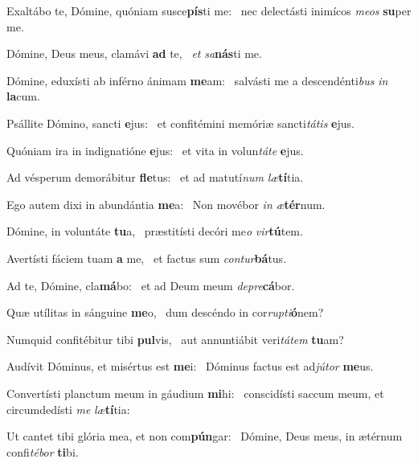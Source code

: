 \item Exaltábo te, Dómine, quóniam susce\textbf{pís}ti me:~\psstar{} nec delectásti inimícos \textit{meos} \textbf{su}per me.
\item Dómine, Deus meus, clamávi \textbf{ad} te,~\psstar{} \textit{et} \textit{sa}\textbf{nás}ti me.
\item Dómine, eduxísti ab inférno ánimam \textbf{me}am:~\psstar{} salvásti me a descendénti\textit{bus} \textit{in} \textbf{la}cum.
\item Psállite Dómino, sancti \textbf{e}jus:~\psstar{} et confitémini memóriæ sancti\textit{tátis} \textbf{e}jus.
\item Quóniam ira in indignatióne \textbf{e}jus:~\psstar{} et vita in volun\textit{táte} \textbf{e}jus.
\item Ad vésperum demorábitur \textbf{fle}tus:~\psstar{} et ad matutí\textit{num} \textit{læ}\textbf{tí}tia.
\item Ego autem dixi in abundántia \textbf{me}a:~\psstar{} Non movébor \textit{in} \textit{æ}\textbf{tér}num.
\item Dómine, in voluntáte \textbf{tu}a,~\psstar{} præstitísti decóri me\textit{o} \textit{vir}\textbf{tú}tem.
\item Avertísti fáciem tuam \textbf{a} me,~\psstar{} et factus sum \textit{contur}\textbf{bá}tus.
\item Ad te, Dómine, cla\textbf{má}bo:~\psstar{} et ad Deum meum \textit{depre}\textbf{cá}bor.
\item Quæ utílitas in sánguine \textbf{me}o,~\psstar{} dum descéndo in cor\textit{rupti}\textbf{ó}nem?
\item Numquid confitébitur tibi \textbf{pul}vis,~\psstar{} aut annuntiábit veri\textit{tátem} \textbf{tu}am?
\item Audívit Dóminus, et misértus est \textbf{me}i:~\psstar{} Dóminus factus est ad\textit{jútor} \textbf{me}us.
\item Convertísti planctum meum in gáudium \textbf{mi}hi:~\psstar{} conscidísti saccum meum, et circumdedísti \textit{me} \textit{læ}\textbf{tí}tia:
\item Ut cantet tibi glória mea, et non com\textbf{pún}gar:~\psstar{} Dómine, Deus meus, in ætérnum confi\textit{tébor} \textbf{ti}bi.
